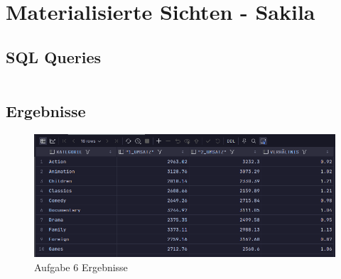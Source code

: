 \documentclass[12pt]{scrartcl}
\begin{document}
\pagebreak

\section{Materialisierte Sichten - Sakila}

\subsection{SQL Queries}

\inputminted{sql}{../ue3_6.sql}

\subsection{Ergebnisse}

\begin{figure}[H]
	\centering
	\includegraphics[width=1\linewidth]{../ue3_6.png}
	\caption{Aufgabe 6 Ergebnisse}
\end{figure}
\end{document}
